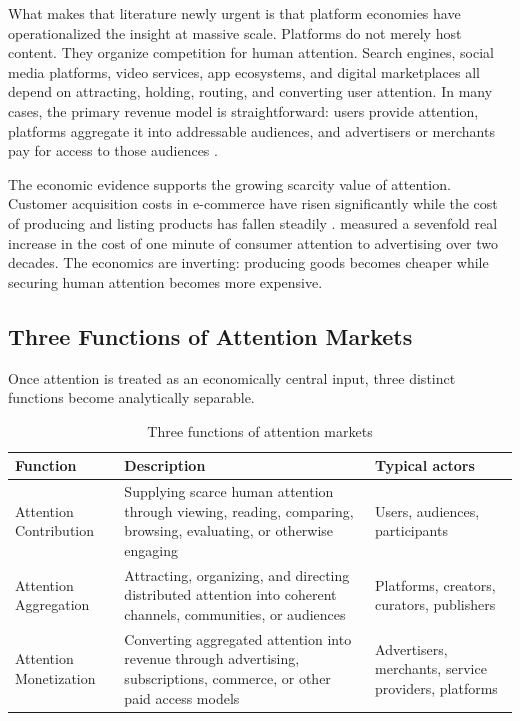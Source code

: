\documentclass[12pt, a4paper]{article}
\begin{document}
What makes that literature newly urgent is that platform economies have operationalized the insight at massive scale. Platforms do not merely host content. They organize competition for human attention. Search engines, social media platforms, video services, app ecosystems, and digital marketplaces all depend on attracting, holding, routing, and converting user attention. In many cases, the primary revenue model is straightforward: users provide attention, platforms aggregate it into addressable audiences, and advertisers or merchants pay for access to those audiences \citep{rochet2003, wu2016}.

The economic evidence supports the growing scarcity value of attention. Customer acquisition costs in e-commerce have risen significantly while the cost of producing and listing products has fallen steadily \citep{simplicitydx2022}. \citet{teixeira2014} measured a sevenfold real increase in the cost of one minute of consumer attention to advertising over two decades. The economics are inverting: producing goods becomes cheaper while securing human attention becomes more expensive.

\subsection{Three Functions of Attention Markets}
\label{sec:triad-functions}

Once attention is treated as an economically central input, three distinct functions become analytically separable.

\begin{table}[H]
\centering
\caption{Three functions of attention markets}
\label{tab:triad}
\begin{tabularx}{\textwidth}{lXX}
\toprule
\textbf{Function} & \textbf{Description} & \textbf{Typical actors} \\
\midrule
Attention Contribution & Supplying scarce human attention through viewing, reading, comparing, browsing, evaluating, or otherwise engaging & Users, audiences, participants \\
\addlinespace
Attention Aggregation & Attracting, organizing, and directing distributed attention into coherent channels, communities, or audiences & Platforms, creators, curators, publishers \\
\addlinespace
Attention Monetization & Converting aggregated attention into revenue through advertising, subscriptions, commerce, or other paid access models & Advertisers, merchants, service providers, platforms \\
\bottomrule
\end{tabularx}
\end{table}
\end{document}
